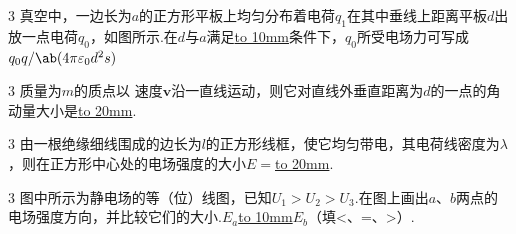 \hspace{-2.16em}
\begin{minipage}{0.67\textwidth}
\begin{exercise}{3}{}
    真空中，一边长为$a$的正方形平板上均匀分布着电荷$q_1$在其中垂线上距离平板$d$出放一点电荷$q_0$，如图所示.在$d$与$a$满足\underline{\hbox to 10mm{}}条件下，$q_0$所受电场力可写成$q_0q/\ab(4\pi\varepsilon_0d^2s)$
\end{exercise}
\end{minipage}
\hfill
\begin{minipage}[c]{0.33\textwidth}
\begin{center}
    \begin{tikzpicture}
    
    \end{tikzpicture}
\end{center}
\end{minipage}

\begin{exercise}{3}{}
    质量为$m$的质点以 速度$\boldsymbol{v}$沿一直线运动，则它对直线外垂直距离为$d$的一点的角动量大小是\underline{\hbox to 20mm{}}.
    \end{exercise}

\begin{exercise}{3}{}
由一根绝缘细线围成的边长为$l$的正方形线框，使它均匀带电，其电荷线密度为$\lambda$，则在正方形中心处的电场强度的大小$E=$\underline{\hbox to 20mm{}}.
\end{exercise}

\hspace{-2.16em}
\begin{minipage}{0.67\textwidth}
    \begin{exercise}{3}{}
        图中所示为静电场的等（位）线图，已知$U_1>U_2>U_3$.在图上画出$a$、$b$两点的电场强度方向，并比较它们的大小.$E_a$\underline{\hbox to 10mm{}}$E_b$（填<、=、>）.
    \end{exercise}
\end{minipage}
\hfill
\begin{minipage}[c]{0.33\textwidth}
\begin{center}
    \begin{tikzpicture}
    
    \end{tikzpicture}
\end{center}
\end{minipage}
\vspace{1em}

